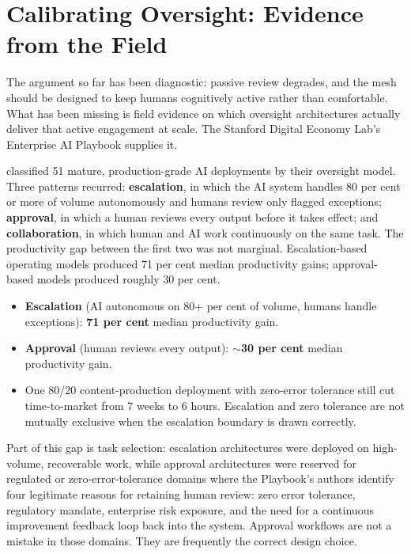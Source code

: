 \section{Calibrating Oversight: Evidence from the Field}

The argument so far has been diagnostic: passive review degrades, and the mesh should be designed to keep humans cognitively active rather than comfortable. What has been missing is field evidence on which oversight architectures actually deliver that active engagement at scale. The Stanford Digital Economy Lab's Enterprise AI Playbook \parencite{Pereira2026Playbook} supplies it.

\textcite{Pereira2026Playbook} classified 51 mature, production-grade AI deployments by their oversight model. Three patterns recurred: \textbf{escalation}, in which the AI system handles 80 per cent or more of volume autonomously and humans review only flagged exceptions; \textbf{approval}, in which a human reviews every output before it takes effect; and \textbf{collaboration}, in which human and AI work continuously on the same task. The productivity gap between the first two was not marginal. Escalation-based operating models produced 71 per cent median productivity gains; approval-based models produced roughly 30 per cent.

\begin{evidencebox}[title={Escalation versus Approval: The Field Evidence}]
\begin{itemize}
  \item \textbf{Escalation} (AI autonomous on 80+ per cent of volume, humans handle exceptions): \textbf{71 per cent} median productivity gain.
  \item \textbf{Approval} (human reviews every output): \textbf{$\sim$30 per cent} median productivity gain.
  \item One 80/20 content-production deployment with zero-error tolerance still cut time-to-market from 7 weeks to 6 hours. Escalation and zero tolerance are not mutually exclusive when the escalation boundary is drawn correctly.
\end{itemize}
\end{evidencebox}

Part of this gap is task selection: escalation architectures were deployed on high-volume, recoverable work, while approval architectures were reserved for regulated or zero-error-tolerance domains where the Playbook's authors identify four legitimate reasons for retaining human review: zero error tolerance, regulatory mandate, enterprise risk exposure, and the need for a continuous improvement feedback loop back into the system. Approval workflows are not a mistake in those domains. They are frequently the correct design choice.

